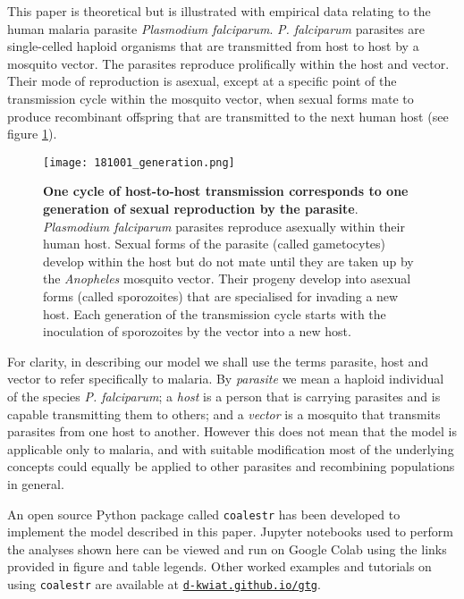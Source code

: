 \documentclass[_main.tex]{subfiles}
\begin{document}
This paper is theoretical but is illustrated with empirical data relating to the human malaria parasite \textit{Plasmodium falciparum}.  \textit{P. falciparum} parasites are single-celled haploid organisms that are transmitted from host to host by a mosquito vector.  The parasites reproduce prolifically within the host and vector.  Their mode of reproduction is asexual, except at a specific point of the transmission cycle within the mosquito vector, when sexual forms mate to produce recombinant offspring that are transmitted to the next human host (see figure \ref{fig:one_generation}).

\begin{figure}[h!]
\centering
\texttt{[image: 181001\_generation.png]}
\caption{\textbf{One cycle of host-to-host transmission corresponds to one generation of sexual reproduction by the parasite}.  \textit{Plasmodium falciparum} parasites reproduce asexually within their human host.  Sexual forms of the parasite (called gametocytes) develop within the host but do not mate until they are taken up by the \textit{Anopheles} mosquito vector.  Their progeny develop into asexual forms (called sporozoites) that are specialised for invading a new host.  Each generation of the transmission cycle starts with the inoculation of sporozoites by the vector into a new host.
}
\label{fig:one_generation}
\end{figure}

For clarity, in describing our model we shall use the terms parasite, host and vector to refer specifically to malaria.  By \textit{parasite} we mean a haploid individual of the species \textit{P. falciparum}; a \textit{host} is a person that is carrying parasites and is capable transmitting them to others; and a \textit{vector} is a mosquito that transmits parasites from one host to another.  However this does not mean that the model is applicable only to malaria, and with suitable modification most of the underlying concepts could equally be applied to other parasites and recombining populations in general. 

An open source Python package called \texttt{coalestr} has been developed to implement the model described in this paper.  Jupyter notebooks used to perform the analyses shown here can be viewed and run on Google Colab using the links provided in figure and table legends.  Other worked examples and tutorials on using \texttt{coalestr} are available at \href{https://d-kwiat.github.io/gtg}{\texttt{d-kwiat.github.io/gtg}}.  
\end{document}
